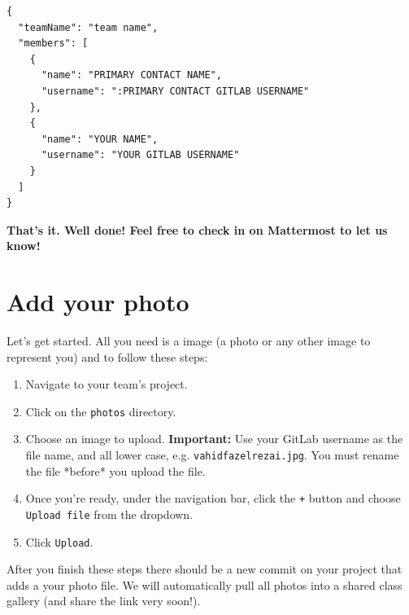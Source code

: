 \documentclass[12pt,twoside]{mitthesis}
\begin{document}
\begin{verbatim}
{
  "teamName": "team name",
  "members": [
    {
      "name": "PRIMARY CONTACT NAME",
      "username": ":PRIMARY CONTACT GITLAB USERNAME"
    },
    {
      "name": "YOUR NAME",
      "username": "YOUR GITLAB USERNAME"
    }
  ]
}
\end{verbatim}

\textbf{That's it. Well done! Feel free to check in on Mattermost to let us know!}


\section*{Add your photo}

Let's get started. All you need is a image (a photo or any other image to represent you) and to follow these steps:

\begin{enumerate}
\item Navigate to your team's project.
\item Click on the \texttt{photos} directory.
\item Choose an image to upload. \textbf{Important:} Use your GitLab username as the file name, and all lower case, e.g. \texttt{vahidfazelrezai.jpg}. You must rename the file *before* you upload the file.
\item Once you're ready, under the navigation bar, click the \texttt{+} button and choose \texttt{Upload file} from the dropdown.
\item Click \texttt{Upload}.
\end{enumerate}

After you finish these steps there should be a new commit on your project that adds a your photo file. We will automatically pull all photos into a shared class gallery (and share the link very soon!). 

\clearpage
\newpage
\begin{singlespace}
\nocite{*}
 

\end{singlespace}
\end{document}
